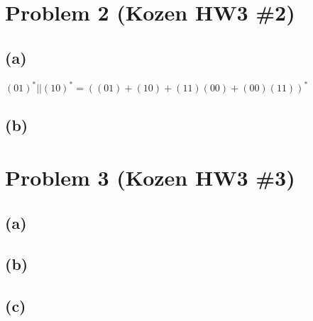 \documentclass[11pt, a4paper, oneside]{article}
\begin{document}
\section*{Problem 2 (Kozen HW3 \#2)}
\subsection*{(a)}
$(01)^* || (10)^* = ((01) + (10) + (11)(00) + (00)(11))^*$

\subsection*{(b)}


\section*{Problem 3 (Kozen HW3 \#3)}
\subsection*{(a)}

\subsection*{(b)}

\subsection*{(c)}
\end{document}
